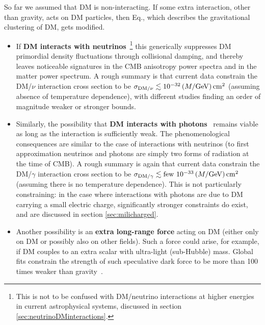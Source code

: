 So far we assumed that DM is non-interacting. If some extra interaction, other than gravity, acts on  DM particles, then
Eq., which describes the gravitational clustering of DM, 
gets modified.
\begin{itemize}
\item[$\circ$] If {\bf DM interacts with neutrinos}~\cite{DMnuinteractionsCMB}\footnote{This is not to be confused 
with DM/neutrino interactions at higher energies in current astrophysical systems, discussed in section \ref{sec:neutrinoDMinteractions}.} 
this generically suppresses DM primordial density fluctuations through collisional damping, 
and thereby leaves noticeable signatures in the CMB anisotropy power spectra and in the matter power spectrum. 
A rough summary is that current data constrain the DM/$\nu$ interaction cross section to be $\sigma_{{\rm DM}/\nu} \lesssim 10^{-32} \left(M/{\rm GeV}\right) {\rm cm}^2$ (assuming absence of temperature dependence), with different studies finding an order of magnitude weaker or stronger bounds. 

\item[$\circ$] Similarly, the possibility that {\bf DM interacts with photons}~\cite{DMgammainteractionsCMB} remains viable as long as the interaction is sufficiently weak.
The phenomenological consequences are similar to the case of interactions with neutrinos (to first approximation neutrinos and photons are simply two forms of radiation at the time of CMB). 
A rough summary is again that current data constrain the DM/$\gamma$ interaction cross section to be $\sigma_{{\rm DM}/\gamma} \lesssim {\rm few} \ 10^{-33} \left(M/{\rm GeV}\right) {\rm cm}^2$ (assuming there is no temperature dependence). 
This is not particularly constraining: in the case where interactions with photons are due to DM carrying a small electric charge, significantly stronger constraints do exist, and are discussed in section \ref{sec:milicharged}.


\item[$\circ$]
Another possibility is an {\bf extra long-range force} acting on DM (either only on DM or possibly also on other fields). 
Such a force could arise, for example, if DM couples to an extra scalar with ultra-light (sub-Hubble) mass.
Global fits constrain the strength of such speculative dark force to be more than 100 times weaker than gravity~\cite{DarkForce}.

\end{itemize}






